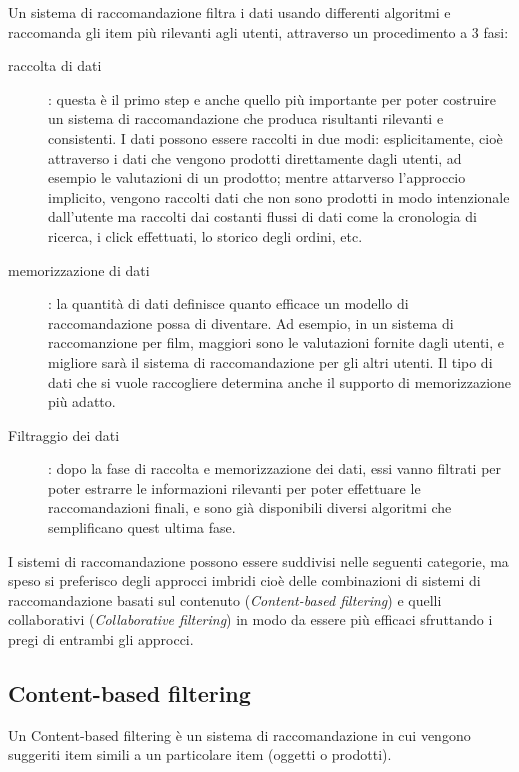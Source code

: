 \cite{model-based-approach-for-collaborative-filtering}
Un sistema di raccomandazione filtra i dati usando differenti algoritmi e raccomanda gli item più rilevanti agli utenti,
attraverso un procedimento a 3 fasi:

\begin{description}
	\item[raccolta di dati]: questa è il primo step e anche quello più importante per poter costruire un sistema di 
	raccomandazione che produca risultanti rilevanti e consistenti. I dati possono essere raccolti in due modi: esplicitamente,
	cioè attraverso i dati che vengono prodotti direttamente dagli utenti, ad esempio le valutazioni di un prodotto; mentre 
	attarverso l'approccio implicito, vengono raccolti dati che non sono prodotti in modo intenzionale dall'utente ma raccolti
	dai costanti flussi di dati come la cronologia di ricerca, i click effettuati, lo storico degli ordini, etc.
	\item[memorizzazione di dati]: la quantità di dati definisce quanto efficace un modello di raccomandazione possa di
	diventare. Ad esempio, in un sistema di raccomanzione per film, maggiori sono le valutazioni fornite dagli utenti, e 
	migliore sarà il sistema di raccomandazione per gli altri utenti. Il tipo di dati che si vuole raccogliere determina
	anche il supporto di memorizzazione più adatto.   
	\item[Filtraggio dei dati]: dopo la fase di raccolta e memorizzazione dei dati, essi vanno filtrati per poter estrarre
	le informazioni rilevanti per poter effettuare le raccomandazioni finali, e sono già disponibili diversi algoritmi che
	semplificano quest ultima fase. 
\end{description}

I sistemi di raccomandazione possono essere suddivisi nelle seguenti categorie, ma speso si preferisco degli approcci imbridi cioè delle
combinazioni di sistemi di raccomandazione basati sul contenuto (\textit{Content-based filtering}) e 
quelli collaborativi (\textit{Collaborative filtering}) in modo da essere più efficaci sfruttando i pregi di entrambi gli approcci.


\subsection{Content-based filtering}
Un Content-based filtering è un sistema di raccomandazione in cui vengono suggeriti item simili a un particolare item (oggetti 
o prodotti). 


